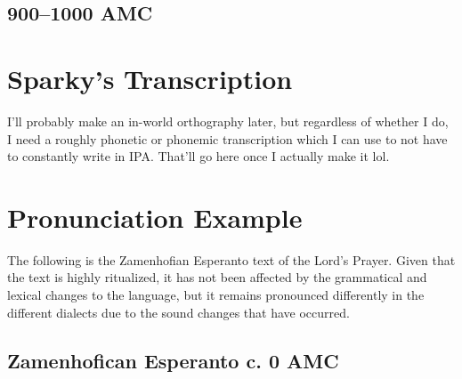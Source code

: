 \documentclass[a4paper,11pt,article,oneside]{memoir}
\begin{document}


\subsection{900--1000 AMC}



\section{Sparky's Transcription}

I'll probably make an in-world orthography later, but regardless of whether I do, I need a roughly phonetic or phonemic transcription which I can use to not have to constantly write in IPA. That'll go here once I actually make it lol.

\clearpage
\section{Pronunciation Example}

The following is the Zamenhofian Esperanto text of the Lord's Prayer. Given that the text is highly ritualized, it has not been affected by the grammatical and lexical changes to the language, but it remains pronounced differently in the different dialects due to the sound changes that have occurred.

\subsection{Zamenhofican Esperanto c. 0 AMC}
\end{document}
